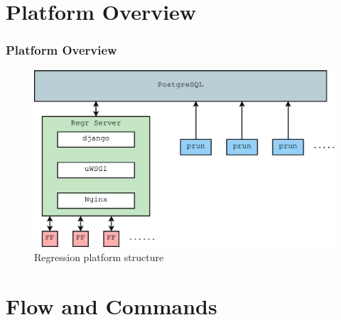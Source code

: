 \documentclass{beamer}
\begin{document}
\section{Platform Overview}

\begin{frame}
  \frametitle{Platform Overview}
  \begin{figure}
    \centering
    \includegraphics[width=0.9\linewidth]{regr_struc}
    \caption{Regression platform structure}
  \end{figure}
\end{frame}

\section{Flow and Commands}
\end{document}
